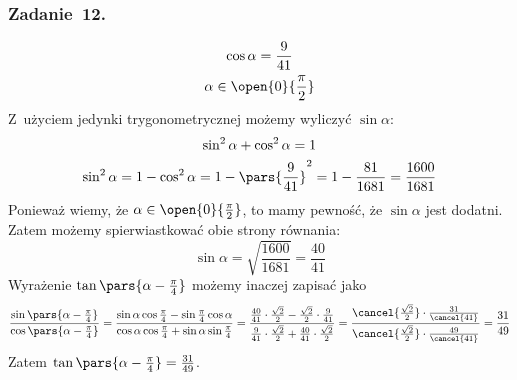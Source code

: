\subsubsection*{Zadanie~12.}
\begin{gather*}
    \cos\alpha = \frac{9}{41}\\
    \alpha \in \open{0}{\frac{\pi}{2}}
\end{gather*}
Z~użyciem jedynki trygonometrycznej możemy wyliczyć \(\sin\alpha\):
\begin{gather*}
    \sin^2\alpha + \cos^2\alpha = 1\\
    \sin^2\alpha = 1 - \cos^2\alpha = 1 - \pars{\frac{9}{41}}^2 = 1 - \frac{81}{1681} = \frac{1600}{1681}
\end{gather*}
Ponieważ wiemy, że \(\alpha \in \open{0}{\frac{\pi}{2}}\), to mamy pewność, że \(\sin\alpha\) jest dodatni. Zatem możemy spierwiastkować obie strony równania:
\begin{equation*}
    \sin\alpha = \sqrt{\frac{1600}{1681}} = \frac{40}{41}
\end{equation*}
Wyrażenie \(\tan\pars{\alpha - \frac{\pi}{4}}\) możemy inaczej zapisać jako
\begin{equation*}
    \frac{\sin\pars{\alpha - \frac{\pi}{4}}}{\cos\pars{\alpha - \frac{\pi}{4}}}
        = \frac{\sin\alpha\cos\frac{\pi}{4} - \sin\frac{\pi}{4}\cos\alpha}{\cos\alpha\cos\frac{\pi}{4} + \sin\alpha\sin\frac{\pi}{4}}
        = \frac{\frac{40}{41} \cdot \frac{\sqrt{2}}{2} - \frac{\sqrt{2}}{2} \cdot \frac{9}{41}}{\frac{9}{41} \cdot \frac{\sqrt{2}}{2} + \frac{40}{41} \cdot \frac{\sqrt{2}}{2}}
        = \frac{\cancel{\frac{\sqrt{2}}{2}} \cdot \frac{31}{\cancel{41}}}{\cancel{\frac{\sqrt{2}}{2}} \cdot \frac{49}{\cancel{41}}}
        = \frac{31}{49}
\end{equation*}
Zatem \(\tan\pars{\alpha - \frac{\pi}{4}} = \frac{31}{49}\).
